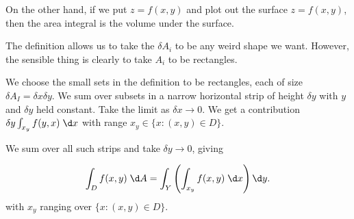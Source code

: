 \documentclass[a4paper]{article}
\begin{document}
On the other hand, if we put $z = f(x, y)$ and plot out the surface $z = f(x, y)$, then the area integral is the volume under the surface.

The definition allows us to take the $\delta A_i$ to be any weird shape we want. However, the sensible thing is clearly to take $A_i$ to be rectangles.

We choose the small sets in the definition to be rectangles, each of size $\delta A_I = \delta x\delta y$. We sum over subsets in a narrow horizontal strip of height $\delta y$ with $y$ and $\delta y$ held constant. Take the limit as $\delta x\to 0$. We get a contribution $\delta y\int_{x_y} f(y, x)\;\d x$ with range $x_y\in \{x: (x, y)\in D\}$.
\begin{center}
\end{center}
We sum over all such strips and take $\delta y\to 0$, giving

\begin{prop}
  \[
    \int_D f(x, y)\;\d A = \int_Y\left(\int_{x_y}f(x, y)\;\d x\right) \d y.
  \]
  with $x_y$ ranging over $\{x: (x, y) \in D\}$.
\end{prop}
\end{document}

